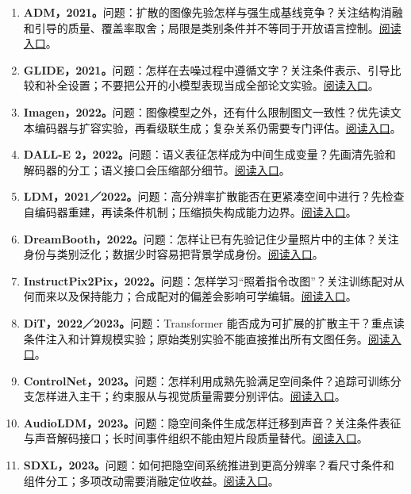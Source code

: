 \begin{enumerate}[leftmargin=*,itemsep=0.65em]
\item \textbf{ADM，2021。}问题：扩散的图像先验怎样与强生成基线竞争？关注结构消融和引导的质量、覆盖率取舍；局限是类别条件并不等同于开放语言控制。\href{https://arxiv.org/abs/2105.05233}{阅读入口}。\cite{a_adm}
\item \textbf{GLIDE，2021。}问题：怎样在去噪过程中遵循文字？关注条件表示、引导比较和补全设置；不要把公开的小模型表现当成全部论文实验。\href{https://arxiv.org/abs/2112.10741}{阅读入口}。\cite{a_glide}
\item \textbf{Imagen，2022。}问题：图像模型之外，还有什么限制图文一致性？优先读文本编码器与扩容实验，再看级联生成；复杂关系仍需要专门评估。\href{https://arxiv.org/abs/2205.11487}{阅读入口}。\cite{a_imagen}
\item \textbf{DALL-E 2，2022。}问题：语义表征怎样成为中间生成变量？先画清先验和解码器的分工；语义接口会压缩部分细节。\href{https://arxiv.org/abs/2204.06125}{阅读入口}。\cite{a_dalle2}
\item \textbf{LDM，2021／2022。}问题：高分辨率扩散能否在更紧凑空间中进行？先检查自编码器重建，再读条件机制；压缩损失构成能力边界。\href{https://arxiv.org/abs/2112.10752}{阅读入口}。\cite{c_rombach2022ldm}
\item \textbf{DreamBooth，2022。}问题：怎样让已有先验记住少量照片中的主体？关注身份与类别泛化；数据少时容易把背景学成身份。\href{https://arxiv.org/abs/2208.12242}{阅读入口}。\cite{a_dreambooth}
\item \textbf{InstructPix2Pix，2022。}问题：怎样学习“照着指令改图”？关注训练配对从何而来以及保持能力；合成配对的偏差会影响可学编辑。\href{https://arxiv.org/abs/2211.09800}{阅读入口}。\cite{a_instructpix}
\item \textbf{DiT，2022／2023。}问题：Transformer 能否成为可扩展的扩散主干？重点读条件注入和计算规模实验；原始类别实验不能直接推出所有文图任务。\href{https://arxiv.org/abs/2212.09748}{阅读入口}。\cite{a_dit}
\item \textbf{ControlNet，2023。}问题：怎样利用成熟先验满足空间条件？追踪可训练分支怎样进入主干；约束服从与视觉质量需要分别评估。\href{https://arxiv.org/abs/2302.05543}{阅读入口}。\cite{a_controlnet}
\item \textbf{AudioLDM，2023。}问题：隐空间条件生成怎样迁移到声音？关注条件表征与声音解码接口；长时间事件组织不能由短片段质量替代。\href{https://arxiv.org/abs/2301.12503}{阅读入口}。\cite{a_audioldm}
\item \textbf{SDXL，2023。}问题：如何把隐空间系统推进到更高分辨率？看尺寸条件和组件分工；多项改动需要消融定位收益。\href{https://arxiv.org/abs/2307.01952}{阅读入口}。\cite{a_sdxl}

\end{enumerate}
